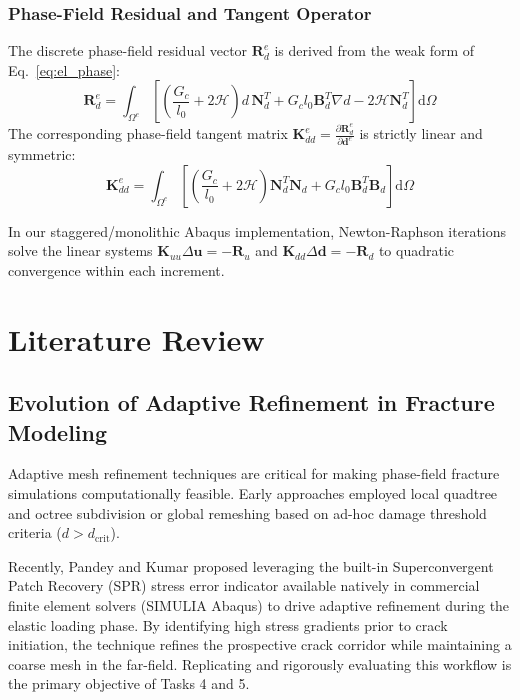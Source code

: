\documentclass[11pt,a4paper]{report}
\begin{document}
\subsection{Phase-Field Residual and Tangent Operator}
The discrete phase-field residual vector $\mathbf{R}_d^e$ is derived from the weak form of Eq.~\eqref{eq:el_phase}:
\begin{equation}
\label{eq:res_d}
\mathbf{R}_d^e = \int_{\Omega^e} \left[ \left( \frac{G_c}{l_0} + 2\mathcal{H} \right) d \, \mathbf{N}_d^T + G_c l_0 \mathbf{B}_d^T \nabla d - 2\mathcal{H} \mathbf{N}_d^T \right] \mathrm{d}\Omega
\end{equation}
The corresponding phase-field tangent matrix $\mathbf{K}_{dd}^e = \frac{\partial \mathbf{R}_d^e}{\partial \mathbf{d}^e}$ is strictly linear and symmetric:
\begin{equation}
\label{eq:tan_d}
\mathbf{K}_{dd}^e = \int_{\Omega^e} \left[ \left( \frac{G_c}{l_0} + 2\mathcal{H} \right) \mathbf{N}_d^T \mathbf{N}_d + G_c l_0 \mathbf{B}_d^T \mathbf{B}_d \right] \mathrm{d}\Omega
\end{equation}

In our staggered/monolithic Abaqus implementation, Newton-Raphson iterations solve the linear systems $\mathbf{K}_{uu} \Delta \mathbf{u} = -\mathbf{R}_u$ and $\mathbf{K}_{dd} \Delta \mathbf{d} = -\mathbf{R}_d$ to quadratic convergence within each increment.

\chapter{Literature Review}
\label{chap:literature}

\section{Evolution of Adaptive Refinement in Fracture Modeling}
Adaptive mesh refinement techniques are critical for making phase-field fracture simulations computationally feasible. Early approaches employed local quadtree and octree subdivision or global remeshing based on ad-hoc damage threshold criteria ($d > d_{\text{crit}}$). 

Recently, Pandey and Kumar \cite{pandey2025} proposed leveraging the built-in Superconvergent Patch Recovery (SPR) stress error indicator available natively in commercial finite element solvers (SIMULIA Abaqus) to drive adaptive refinement during the elastic loading phase. By identifying high stress gradients prior to crack initiation, the technique refines the prospective crack corridor while maintaining a coarse mesh in the far-field. Replicating and rigorously evaluating this workflow is the primary objective of Tasks 4 and 5.
\end{document}
